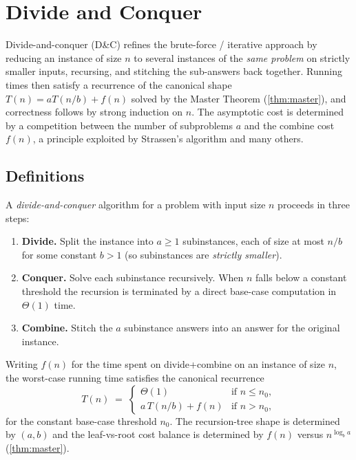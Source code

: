 \section{Divide and Conquer}
\label{sec:dnc}

Divide-and-conquer (D\&C) refines the brute-force / iterative approach by reducing an instance of size $n$ to several instances of the \emph{same problem} on strictly smaller inputs, recursing, and stitching the sub-answers back together. Running times then satisfy a recurrence of the canonical shape $T(n) = a T(n/b) + f(n)$ solved by the Master Theorem (\cref{thm:master}), and correctness follows by strong induction on $n$. The asymptotic cost is determined by a competition between the number of subproblems $a$ and the combine cost $f(n)$, a principle exploited by Strassen's algorithm and many others.

\subsection{Definitions}

\begin{definition}
\label{def:dnc_paradigm}
A \emph{divide-and-conquer} algorithm for a problem with input size $n$ proceeds in three steps:
\begin{enumerate}[(1)]
  \item \textbf{Divide.} Split the instance into $a \ge 1$ subinstances, each of size at most $n/b$ for some constant $b > 1$ (so subinstances are \emph{strictly smaller}).
  \item \textbf{Conquer.} Solve each subinstance recursively. When $n$ falls below a constant threshold the recursion is terminated by a direct base-case computation in $\Theta(1)$ time.
  \item \textbf{Combine.} Stitch the $a$ subinstance answers into an answer for the original instance.
\end{enumerate}
Writing $f(n)$ for the time spent on divide+combine on an instance of size $n$, the worst-case running time satisfies the canonical recurrence
\[
  T(n) \;=\;
  \begin{cases}
    \Theta(1) & \text{if } n \le n_0, \\
    a\,T(n/b) + f(n) & \text{if } n > n_0,
  \end{cases}
\]
for the constant base-case threshold $n_0$. The recursion-tree shape is determined by $(a, b)$ and the leaf-vs-root cost balance is determined by $f(n)$ versus $n^{\log_b a}$ (\cref{thm:master}).
\end{definition}

